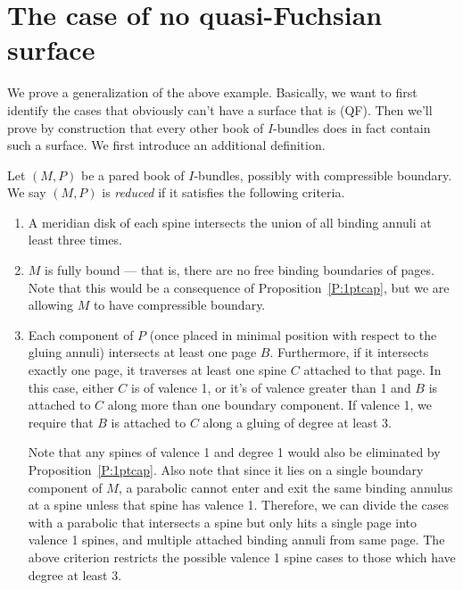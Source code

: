 \section{The case of no quasi-Fuchsian surface}

We prove a generalization of the above example. Basically, we want to first
identify the cases that obviously can't have a surface that is (QF). Then we'll
prove by construction that every other book of $I$-bundles does in fact contain
such a surface. We first introduce an additional definition.

\begin{defn}

Let $(M,P)$ be a pared book of $I$-bundles, possibly with compressible
boundary. We say $(M,P)$ is \emph{reduced} if it satisfies the following
criteria.

\begin{enumerate}

\item A meridian disk of each spine intersects the union of all binding annuli
at least three times.

\item $M$ is fully bound --- that is, there are no free binding boundaries of
pages. Note that this would be a consequence of Proposition~\ref{P:1ptcap}, but
we are allowing $M$ to have compressible boundary.

\item Each component of $P$ (once placed in minimal position with respect to
the gluing annuli) intersects at least one page $B$. Furthermore, if it
intersects exactly one page, it traverses at least one spine $C$ attached to
that page. In this case, either $C$ is of valence 1, or it's of valence greater
than 1 and $B$ is attached to $C$ along more than one boundary component.  If
valence 1, we require that $B$ is attached to $C$ along a gluing of degree at
least 3.

Note that any spines of valence 1 and degree 1 would also be eliminated by
Proposition~\ref{P:1ptcap}.  Also note that since it lies on a single boundary
component of $M$, a parabolic cannot enter and exit the same binding annulus at
a spine unless that spine has valence 1. Therefore, we can divide the cases
with a parabolic that intersects a spine but only hits a single page into
valence 1 spines, and multiple attached binding annuli from same page.  The
above criterion restricts the possible valence 1 spine cases to those which
have degree at least 3.

\end{enumerate}

\end{defn}


